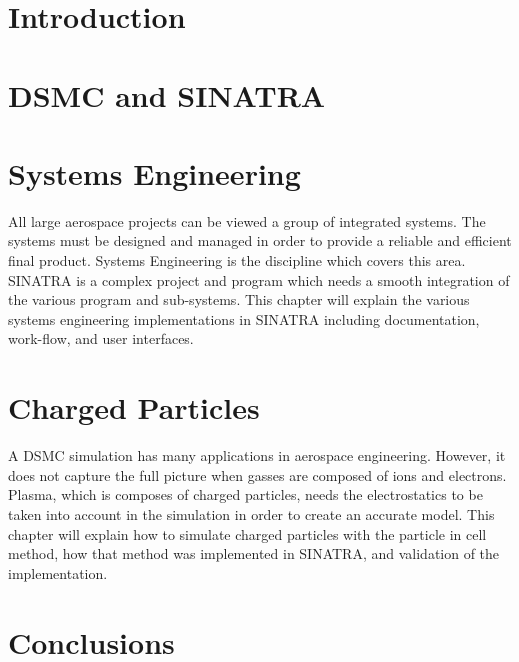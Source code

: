 \chapter{Introduction}
\label{chap:intro}


\chapter{DSMC and SINATRA}
\label{chap:dsmc}



\chapter{Systems Engineering}
\label{chap:systems}
All large aerospace projects can be viewed a group of integrated systems. The systems must be designed and managed in order to provide a reliable and efficient final product. Systems Engineering is the discipline which covers this area. SINATRA is a complex project and program which needs a smooth integration of the various program and sub-systems. This chapter will explain the various systems engineering implementations in SINATRA including documentation, work-flow, and user interfaces. 




\chapter{Charged Particles}
A DSMC simulation has many applications in aerospace engineering. However, it does not capture the full picture when gasses are composed of ions and electrons. Plasma, which is composes of charged particles, needs the electrostatics to be taken into account in the simulation in order to create an accurate model. This chapter will explain how to simulate charged particles with the particle in cell method, how that method was implemented in SINATRA, and validation of the implementation.
\label{chap:charge}




\chapter{Conclusions}
\label{chap:conclusions}

